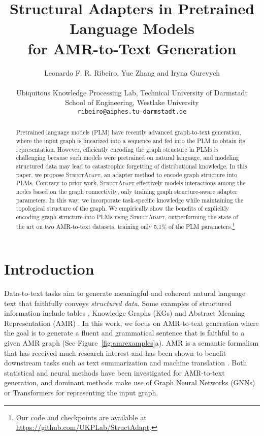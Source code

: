 \documentclass[11pt]{article}
\title{Structural Adapters in Pretrained Language Models \\ for AMR-to-Text Generation}
\author{Leonardo F. R. Ribeiro, Yue Zhang and Iryna Gurevych \vspace{1mm} \\
\rule{0pt}{2.5ex}
  Ubiquitous Knowledge Processing Lab, Technical University of Darmstadt\\
  School of Engineering, Westlake University \\
 \texttt{ribeiro@aiphes.tu-darmstadt.de}
}
\newcommand\ftnote[1]{\footnote{\raggedright#1}}
\newcommand{\graphadapter}{{\small\textsc{StructAdapt}}\xspace}
\begin{document}
\maketitle
\begin{abstract}

Pretrained language models (PLM) have recently advanced graph-to-text generation, where the input graph is linearized into a sequence and fed into the PLM to obtain its representation. However, efficiently encoding the graph structure in PLMs is challenging because such models were pretrained on natural language, and modeling structured data may lead to catastrophic forgetting of distributional knowledge. In this paper, we propose \graphadapter, an adapter method to encode graph structure into PLMs. Contrary to prior work, \graphadapter effectively models interactions among the nodes based on the graph connectivity, only training graph structure-aware adapter parameters. In this way, we incorporate task-specific knowledge while maintaining the topological structure of the graph. We empirically show the benefits of explicitly encoding graph structure into PLMs using \graphadapter, outperforming the state of the art on two AMR-to-text datasets, training only 5.1\% of the PLM parameters.\ftnote{Our code and checkpoints are available at \href{https://github.com/UKPLab/StructAdapt}{https://github.com/UKPLab/StructAdapt}.}
\end{abstract}

\section{Introduction}

Data-to-text tasks aim to generate meaningful and coherent natural language text that faithfully conveys \emph{structured data}. Some examples of structured information include tables \cite{parikh-etal-2020-totto}, Knowledge Graphs (KGs) \cite{gardent-etal-2017-webnlg, VOUGIOUKLIS20181} and Abstract Meaning Representation (AMR) \cite{banarescu-etal-2013-abstract}. In this work, we focus on AMR-to-text generation where the goal is to generate a fluent and grammatical sentence that is faithful to a given AMR graph (See Figure~\ref{fig:amrexamples}a). AMR is a semantic formalism that has received much research interest \cite{song-etal-2018-graph, doi:10.116200269, ribeiro-etal-2019-enhancing, opitz-etal-2020-amr, bamboo, fu-etal-2021-end} and has been shown to benefit downstream tasks such as text summarization \cite{liao-etal-2018-abstract} and machine translation \cite{doi:10.116200252}.  Both statistical \cite{flanigan-etal-2016-generation, pourdamghani-etal-2016-generating} and neural methods \cite{bai-etal-2020-online,cai-lam-2020-graph} have been investigated for AMR-to-text generation, and dominant methods make use of Graph Neural Networks (GNNs) \cite{Kipf:2016tc} or Transformers \cite{NIPS2017_7181} for representing the input graph.
\end{document}
